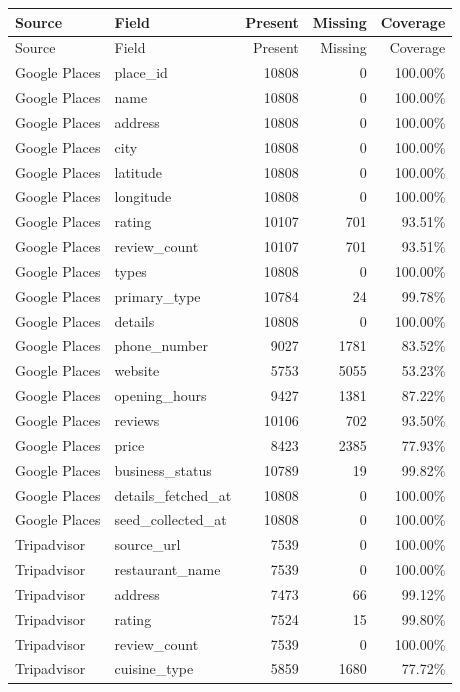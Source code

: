 {\small
\begin{longtable}{llrrr}
\toprule
Source & Field & Present & Missing & Coverage \\
\midrule
\endfirsthead
\toprule
Source & Field & Present & Missing & Coverage \\
\midrule
\endhead
Google Places & place\_id & 10808 & 0 & 100.00\% \\
Google Places & name & 10808 & 0 & 100.00\% \\
Google Places & address & 10808 & 0 & 100.00\% \\
Google Places & city & 10808 & 0 & 100.00\% \\
Google Places & latitude & 10808 & 0 & 100.00\% \\
Google Places & longitude & 10808 & 0 & 100.00\% \\
Google Places & rating & 10107 & 701 & 93.51\% \\
Google Places & review\_count & 10107 & 701 & 93.51\% \\
Google Places & types & 10808 & 0 & 100.00\% \\
Google Places & primary\_type & 10784 & 24 & 99.78\% \\
Google Places & details & 10808 & 0 & 100.00\% \\
Google Places & phone\_number & 9027 & 1781 & 83.52\% \\
Google Places & website & 5753 & 5055 & 53.23\% \\
Google Places & opening\_hours & 9427 & 1381 & 87.22\% \\
Google Places & reviews & 10106 & 702 & 93.50\% \\
Google Places & price & 8423 & 2385 & 77.93\% \\
Google Places & business\_status & 10789 & 19 & 99.82\% \\
Google Places & details\_fetched\_at & 10808 & 0 & 100.00\% \\
Google Places & seed\_collected\_at & 10808 & 0 & 100.00\% \\
Tripadvisor & source\_url & 7539 & 0 & 100.00\% \\
Tripadvisor & restaurant\_name & 7539 & 0 & 100.00\% \\
Tripadvisor & address & 7473 & 66 & 99.12\% \\
Tripadvisor & rating & 7524 & 15 & 99.80\% \\
Tripadvisor & review\_count & 7539 & 0 & 100.00\% \\
Tripadvisor & cuisine\_type & 5859 & 1680 & 77.72\% \\

\end{longtable}}
